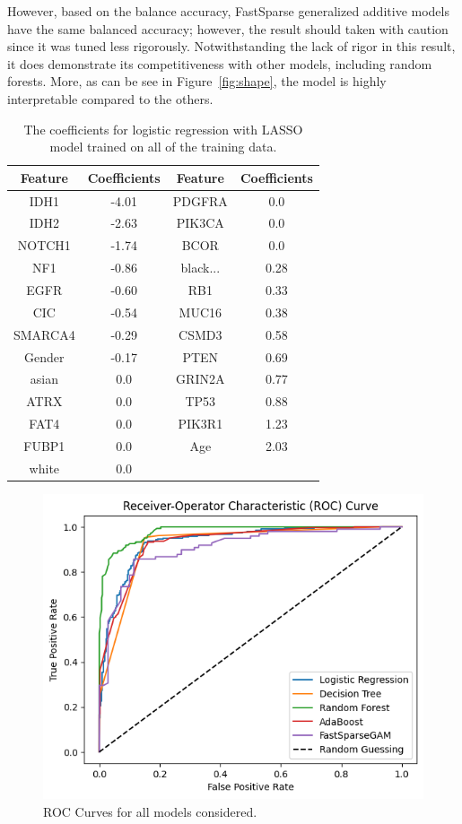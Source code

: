 \documentclass[12pt]{article}
\newtheorem{Proof of Lemma}{Proof of Lemma}
\begin{document}
However, based on the balance accuracy, FastSparse generalized additive models have the same balanced accuracy; however, the result should taken with caution since it was 
tuned less rigorously. Notwithstanding the lack of rigor in this result, it does demonstrate its competitiveness with other models, including random forests.
More, as can be see in Figure~\ref{fig:shape}, the model is highly interpretable compared to the others. 
\begin{table}[h!]
  \centering
  \caption{The coefficients for logistic regression with LASSO model trained on all of the training data.}
  \begin{tabular}{|c|c||c|c|}
    \hline
    Feature &	Coefficients & Feature & Coefficients\\ \hline
    IDH1    &	-4.01 & PDGFRA  &	0.0 \\ 
    IDH2    &	-2.63 & PIK3CA  &	0.0 \\ 
    NOTCH1  &	-1.74 & BCOR &	0.0\\ 
    NF1     &	-0.86 & black... &	0.28\\
    EGFR    &	-0.60 & RB1 &	0.33 \\
    CIC     &	-0.54 & MUC16 &	0.38 \\ 
    SMARCA4 &	-0.29 & CSMD3	& 0.58\\
    Gender  &	-0.17 & PTEN	& 0.69\\ 
    asian   &	0.0  & GRIN2A &	0.77\\ 
    ATRX    &	0.0 & TP53 &	0.88\\ 
    FAT4    &	0.0 & PIK3R1 &	1.23\\ 
    FUBP1   &	0.0 & Age & 2.03\\
    white   &	0.0 & & \\ \hline
  \end{tabular}
  \label{tab:coefs}
  \end{table}

  \begin{figure}[h!]
    \centering
    \includegraphics[scale = 1]{roc-results.png}
    \caption{ROC Curves for all models considered. }
    \label{fig:roc-results}
  \end{figure}
\newpage 
\end{document}
